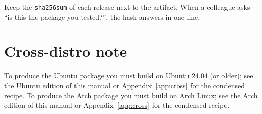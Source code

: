 \begin{kbtip}
Keep the \texttt{sha256sum} of each release next to the artifact. When a colleague asks ``is this the
package you tested?'', the hash answers in one line.
\end{kbtip}

\section{Cross-distro note}
\ifarch
To produce the Ubuntu package you must build on Ubuntu 24.04 (or older); see the Ubuntu edition of this
manual or Appendix~\ref{app:cross} for the condensed recipe.
\else
To produce the Arch package you must build on Arch Linux; see the Arch edition of this manual or
Appendix~\ref{app:cross} for the condensed recipe.
\fi
